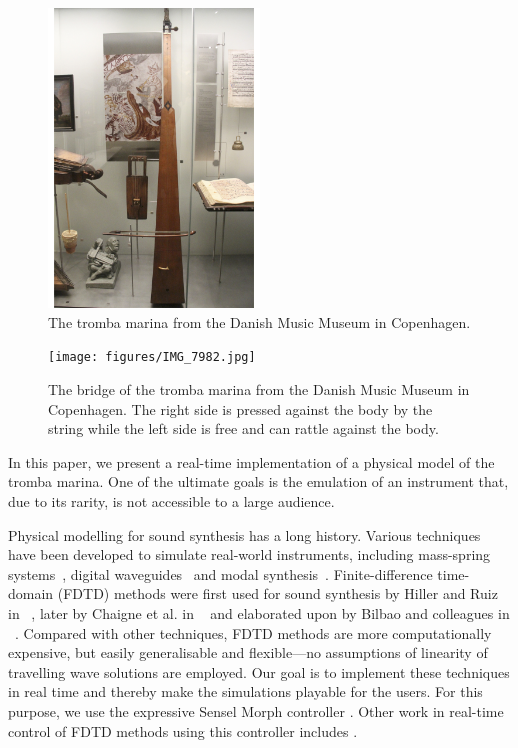       
    \begin{figure}
      \centering
      \includegraphics[width=0.5\textwidth]{figures/IMG_7980.jpg}
      \caption{The tromba marina from the Danish Music Museum in Copenhagen. }
      \label{fig:tromba}
    \end{figure}
    
      \begin{figure}
      \centering
      \texttt{[image: figures/IMG\_7982.jpg]}
      \caption{The bridge of the tromba marina from the Danish Music Museum in Copenhagen. The right side is pressed against the body by the string while the left side is free and can rattle against the body.}
      \label{fig:bridge}
    \end{figure}
    
    In this paper, we present a real-time implementation of a physical model of the tromba marina. One of the ultimate goals is the emulation of an instrument that, due to its rarity, is not accessible to a large audience.
    
    Physical modelling for sound synthesis has a long history. Various techniques have been developed to simulate real-world instruments, including mass-spring systems~\cite{cadoz79}, digital waveguides~\cite{smith1992physical} and modal synthesis~\cite{morrison1993mosaic}.
    Finite-difference time-domain (FDTD) methods were first used for sound synthesis by Hiller and Ruiz in ~\cite{Ruiz1969, Hiller1971, Hiller2}, later by Chaigne et al. in ~\cite{Chaigne92, Chaigne} and elaborated upon by Bilbao and colleagues in ~\cite{bilbao2009numerical, Bilbao2018:Tutorial}. Compared with other techniques, FDTD methods are more computationally expensive, but easily generalisable and flexible---no assumptions of linearity of travelling wave solutions are employed. Our goal is to implement these techniques in real time and thereby make the simulations playable for the users. For this purpose, we use the expressive Sensel Morph controller \cite{sensel2020}. Other work in real-time control of FDTD methods using this controller includes \cite{Willemsen2019a:SMC2020}. 
    
